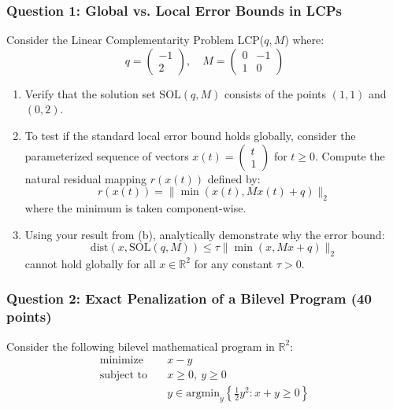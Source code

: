 \documentclass[pdflatex,sn-mathphys-num]{sn-jnl}%
\theoremstyle{definition}
\begin{document}
\subsubsection*{Question 1: Global vs. Local Error Bounds in LCPs}
Consider the Linear Complementarity Problem LCP($q, M$) where:
$$ q = \begin{pmatrix} -1 \\ 2 \end{pmatrix}, \quad M = \begin{pmatrix} 0 & -1 \\ 1 & 0 \end{pmatrix} $$

\begin{enumerate}
    \item[(a)] Verify that the solution set $\text{SOL}(q, M)$ consists of the points $(1,1)$ and $(0,2)$.
    \item[(b)] To test if the standard local error bound holds globally, consider the parameterized sequence of vectors $x(t) = \begin{pmatrix} t \\ 1 \end{pmatrix}$ for $t \ge 0$. Compute the natural residual mapping $r(x(t))$ defined by:
    $$ r(x(t)) = \| \min(x(t), M x(t) + q) \|_2 $$
    where the minimum is taken component-wise.
    \item[(c)] Using your result from (b), analytically demonstrate why the error bound:
    $$ \text{dist}(x, \text{SOL}(q,M)) \le \tau \| \min(x, Mx+q) \|_2 $$
    cannot hold globally for all $x \in \mathbb{R}^2$ for any constant $\tau > 0$.
\end{enumerate}

\subsubsection*{Question 2: Exact Penalization of a Bilevel Program (40 points)}
Consider the following bilevel mathematical program in $\mathbb{R}^2$:
\begin{align*}
    \text{minimize} \quad & x - y \\
    \text{subject to} \quad & x \ge 0, \ y \ge 0 \\
    & y \in \text{argmin}_y \left\{ \frac{1}{2}y^2 : x + y \ge 0 \right\}
\end{align*}
\end{document}

